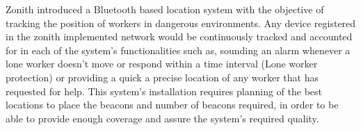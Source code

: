   
  
  
Zonith \cite{zonith} introduced a Bluetooth based location system with the objective of tracking the position of workers in dangerous environments. Any device registered in the zonith implemented network would be continuously tracked and accounted for in each of the system's functionalities such as, sounding an alarm whenever a lone worker doesn't move or respond within a time interval (Lone worker protection) or providing a quick a precise location of any worker that has requested for help. This system's installation requires planning of the best locations to place the beacons and number of beacons required, in order to be able to provide enough coverage and assure the system's required quality.  
  
 
